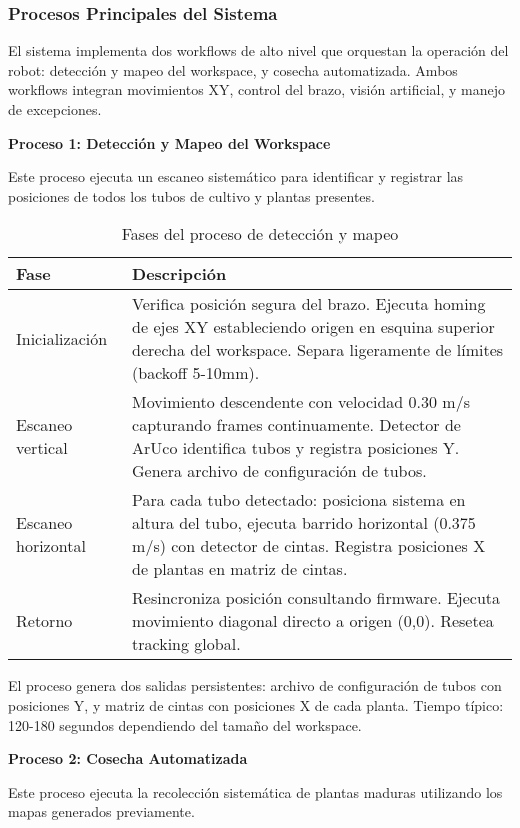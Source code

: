 \subsubsection{Procesos Principales del Sistema}

El sistema implementa dos workflows de alto nivel que orquestan la operación del robot: detección y mapeo del workspace, y cosecha automatizada. Ambos workflows integran movimientos XY, control del brazo, visión artificial, y manejo de excepciones.

\textbf{Proceso 1: Detección y Mapeo del Workspace}

Este proceso ejecuta un escaneo sistemático para identificar y registrar las posiciones de todos los tubos de cultivo y plantas presentes.

\begin{table}[H]
\centering
\small
\begin{tabular}{|l|p{11cm}|}
\hline
\textbf{Fase} & \textbf{Descripción} \\
\hline
Inicialización & Verifica posición segura del brazo. Ejecuta homing de ejes XY estableciendo origen en esquina superior derecha del workspace. Separa ligeramente de límites (backoff 5-10mm). \\
\hline
Escaneo vertical & Movimiento descendente con velocidad 0.30 m/s capturando frames continuamente. Detector de ArUco identifica tubos y registra posiciones Y. Genera archivo de configuración de tubos. \\
\hline
Escaneo horizontal & Para cada tubo detectado: posiciona sistema en altura del tubo, ejecuta barrido horizontal (0.375 m/s) con detector de cintas. Registra posiciones X de plantas en matriz de cintas. \\
\hline
Retorno & Resincroniza posición consultando firmware. Ejecuta movimiento diagonal directo a origen (0,0). Resetea tracking global. \\
\hline
\end{tabular}
\caption{Fases del proceso de detección y mapeo}
\label{tab:proceso_deteccion}
\end{table}

El proceso genera dos salidas persistentes: archivo de configuración de tubos con posiciones Y, y matriz de cintas con posiciones X de cada planta. Tiempo típico: 120-180 segundos dependiendo del tamaño del workspace.

\textbf{Proceso 2: Cosecha Automatizada}

Este proceso ejecuta la recolección sistemática de plantas maduras utilizando los mapas generados previamente.

